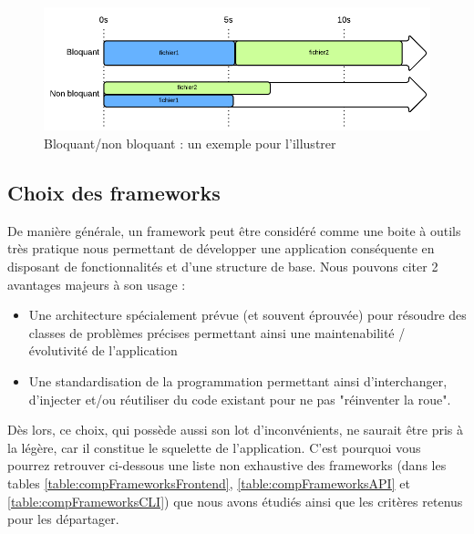 \begin{figure}[H]
    \includegraphics[width=\textwidth,height=0.19\textheight,keepaspectratio]{images/ComparaisonBloquantOuNon.png}
    \centering
    \caption[Bloquant/non bloquant : un exemple pour l'illustrer]{Bloquant/non bloquant : un exemple pour l'illustrer~\cite{NodejsIllustrations}}
    \label{pic:BloquantOrNot}
\end{figure}

\pagebreak

\subsection*{Choix des frameworks}

De manière générale, un framework peut être considéré comme une boite à outils très pratique nous permettant de développer une application conséquente en disposant de fonctionnalités et d'une structure de base. Nous pouvons citer 2 avantages majeurs à son usage : 
\begin{itemize}
    \item Une architecture spécialement prévue (et souvent éprouvée) pour résoudre des classes de problèmes précises permettant ainsi une maintenabilité / évolutivité  de l'application
    \item Une standardisation de la programmation permettant ainsi d'interchanger, d'injecter et/ou réutiliser du code existant pour ne pas "réinventer la roue".
\end{itemize}
Dès lors, ce choix, qui possède aussi son lot d'inconvénients, ne saurait être pris à la légère, car il constitue le squelette de l'application. C'est pourquoi vous pourrez retrouver ci-dessous une liste non exhaustive des frameworks (dans les tables \ref{table:compFrameworksFrontend}, \ref{table:compFrameworksAPI} et \ref{table:compFrameworksCLI}) que nous avons étudiés ainsi que les critères retenus pour les départager. \\

